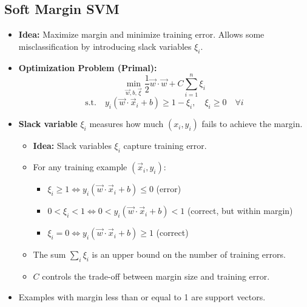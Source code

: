 \subsection{Soft Margin SVM}
\begin{itemize}
    \item \textbf{Idea:} Maximize margin and minimize training error. Allows some misclassification by introducing slack variables $\xi_i$.
    \item \textbf{Optimization Problem (Primal):}
    \[
        \min_{\vec{w}, b, \vec{\xi}} \frac{1}{2} \vec{w} \cdot \vec{w} + C \sum_{i=1}^n \xi_i
    \]
    \[
        \text{s.t.} \quad y_i(\vec{w} \cdot \vec{x}_i + b) \geq 1 - \xi_i, \quad \xi_i \geq 0 \quad \forall i
    \]
    \item \textbf{Slack variable} $\xi_i$ measures how much $(x_i, y_i)$ fails to achieve the margin.
    \begin{itemize}
        \item \textbf{Idea:} Slack variables $\xi_i$ capture training error.
        \item For any training example $(\vec{x}_i, y_i)$:
        \begin{itemize}
            \item $\xi_i \geq 1 \iff y_i(\vec{w} \cdot \vec{x}_i + b) \leq 0$ (error)
            \item $0 < \xi_i < 1 \iff 0 < y_i(\vec{w} \cdot \vec{x}_i + b) < 1$ (correct, but within margin)
            \item $\xi_i = 0 \iff y_i(\vec{w} \cdot \vec{x}_i + b) \geq 1$ (correct)
        \end{itemize}
        \item The sum $\sum_i \xi_i$ is an upper bound on the number of training errors.
        \item $C$ controls the trade-off between margin size and training error.
    \end{itemize}
    \item Examples with margin less than or equal to 1 are support vectors.
\end{itemize}